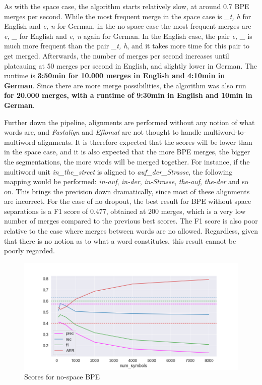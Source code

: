 As with the space case, the algorithm starts relatively slow, at around 0.7 BPE merges per second. While the most frequent merge in the space case is \emph{\_t, h} for English and \emph{e, n} for German, in the no-space case the most frequent merges are \emph{e, \_} for English and \emph{e, n} again for German. In the English case, the pair \emph{e, \_} is much more frequent than the pair \emph{\_t, h}, and it takes more time for this pair to get merged. Afterwards, the number of merges per second increases until plateauing at 50 merges per second in English, and slightly lower in German. The runtime is \textbf{3:50min for 10.000 merges in English and 4:10min in German}. Since there are more merge possibilities, the algorithm was also run \textbf{for 20.000 merges, with a runtime of 9:30min in English and 10min in German}.

Further down the pipeline, alignments are performed without any notion of what words are, and \emph{Fastalign} and \emph{Eflomal} are not thought to handle multiword-to-multiword alignments. It is therefore expected that the scores will be lower than in the space case, and it is also expected that the more BPE merges, the bigger the segmentations, the more words will be merged together. For instance, if the multiword unit \emph{in\_the\_street} is aligned to \emph{auf\_der\_Strasse}, the following mapping would be performed: \emph{in-auf}, \emph{in-der}, \emph{in-Strasse}, \emph{the-auf}, \emph{the-der} and so on. This brings the precision down dramatically, since most of these alignments are incorrect. For the case of no dropout, the best result for BPE without space separations is a F1 score of 0.477, obtained at 200 merges, which is a very low number of merges compared to the previous best scores. The F1 score is also poor relative to the case where merges between words are no allowed. Regardless, given that there is no notion as to what a word constitutes, this result cannot be poorly regarded.

\begin{figure}[!ht]
    \centering
    \includegraphics[width=13cm]{../reports/scores_normal_bpe/eng_deu_ns_fastalign.png}
    \caption{Scores for no-space BPE}
\end{figure}


